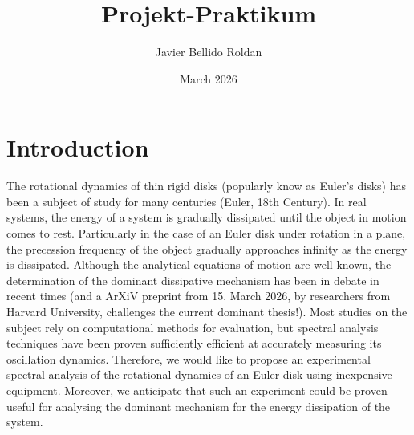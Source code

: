 \documentclass{article}
\title{Projekt-Praktikum}
\author{Javier Bellido Roldan}
\date{March 2026}
\begin{document}
\maketitle

\section{Introduction}
The rotational dynamics of thin rigid disks (popularly know as Euler's disks) has been a subject of study for many centuries (Euler, 18th Century). In real systems, the energy of a system is gradually dissipated until the object in motion comes to rest. Particularly in the case of an Euler disk under rotation in a plane, the precession frequency of the object gradually approaches infinity as the energy is dissipated. Although the analytical equations of motion are well known, the determination of the dominant dissipative mechanism has been in debate in recent times (and a ArXiV preprint from 15. March 2026, by researchers from Harvard University, challenges the current dominant thesis!). Most studies on the subject rely on computational methods for evaluation, but spectral analysis techniques have been proven sufficiently efficient at accurately measuring its oscillation dynamics. Therefore, we would like to propose an experimental spectral analysis of the rotational dynamics of an Euler disk using inexpensive equipment. Moreover, we anticipate that such an experiment could be proven useful for analysing the dominant mechanism for the energy dissipation of the system.
\end{document}
